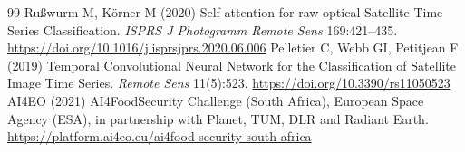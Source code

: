 \documentclass[journal]{IEEEtran}
\begin{document}
\begin{thebibliography}{99}
Ru\ss{}wurm M, K\"orner M (2020) Self-attention for raw optical Satellite Time Series Classification. \textit{ISPRS J Photogramm Remote Sens} 169:421--435. \href{https://doi.org/10.1016/j.isprsjprs.2020.06.006}{https://doi.org/10.1016/j.isprsjprs.2020.06.006}
Pelletier C, Webb GI, Petitjean F (2019) Temporal Convolutional Neural Network for the Classification of Satellite Image Time Series. \textit{Remote Sens} 11(5):523. \href{https://doi.org/10.3390/rs11050523}{https://doi.org/10.3390/rs11050523}
AI4EO (2021) AI4FoodSecurity Challenge (South Africa), European Space Agency (ESA), in partnership with Planet, TUM, DLR and Radiant Earth. \href{https://platform.ai4eo.eu/ai4food-security-south-africa}{https://platform.ai4eo.eu/ai4food-security-south-africa}
\end{thebibliography}
\end{document}
